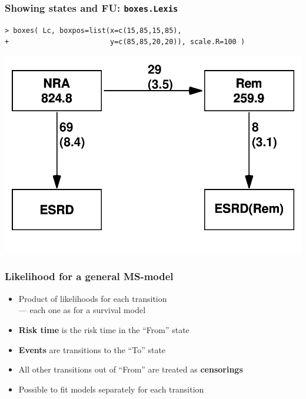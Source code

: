 \begin{frame}[fragile]
  \frametitle{Showing states and FU: \texttt{boxes.Lexis}}
\renewcommand{\baselinestretch}{0.8}
\footnotesize
\begin{verbatim}
> boxes( Lc, boxpos=list(x=c(15,85,15,85),
+                        y=c(85,85,20,20)), scale.R=100 )
\end{verbatim}
\normalsize
\renewcommand{\baselinestretch}{1.0}
\includegraphics[height=0.7\textheight,keepaspectratio]{./NRA-death-4}
\end{frame}

\begin{frame}[fragile]
  \frametitle{Likelihood for a general MS-model}
  \begin{itemize}[<+->]
  \item Product of likelihoods for each transition\\
        --- each one as for a survival model
  \item \textbf{Risk time} is the risk time in the ``From'' state
  \item \textbf{Events} are transitions to the ``To'' state
  \item All other transitions out of ``From'' are treated as \textbf{censorings}
  \item Possible to fit models separately for each transition
  \end{itemize}
\end{frame}

